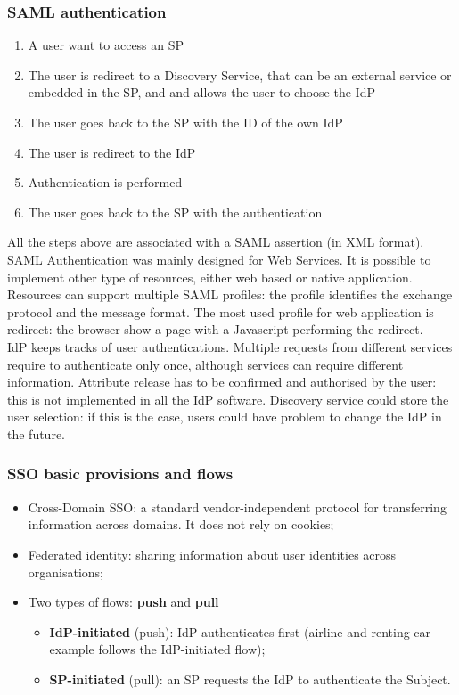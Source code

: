 \documentclass[a4paper, 10pt, titlepage]{article}
\begin{document}
\subsubsection{SAML authentication}
\begin{enumerate}
\item A user want to access an SP
\item The user is redirect to a Discovery Service, that can be an external service or embedded in the SP, and and allows the user to choose the IdP
\item The user goes back to the SP with the ID of the own IdP
\item The user is redirect to the IdP
\item Authentication is performed
\item The user goes back to the SP with the authentication
\end{enumerate}
All the steps above are associated with a SAML assertion (in XML format). SAML Authentication was mainly designed for Web Services. It is possible to implement other type of resources, either web based or native application. Resources can support multiple SAML profiles: the profile identifies the exchange protocol and the message format. The most used profile for web application is redirect: the browser show a page with a Javascript performing the redirect. \medskip\\
IdP keeps tracks of user authentications. Multiple requests from different services require to authenticate only once, although services can require different information. Attribute release has to be confirmed and authorised by the user: this is not implemented in all the IdP software. Discovery service could store the user selection: if this is the case, users could have problem to change the IdP in the future.

\subsubsection{SSO basic provisions and flows}
\begin{itemize}
\item Cross-Domain SSO: a standard vendor-independent protocol for transferring information across domains. It does not rely on cookies;
\item Federated identity: sharing information about user identities across organisations;
\item Two types of flows: \textbf{push} and \textbf{pull}
	\begin{itemize}
	\item \textbf{IdP-initiated} (push): IdP authenticates first (airline and renting car example follows the IdP-initiated flow);
	\item \textbf{SP-initiated} (pull): an SP requests the IdP to authenticate the Subject.
	\end{itemize}
\end{itemize}
\end{document}
